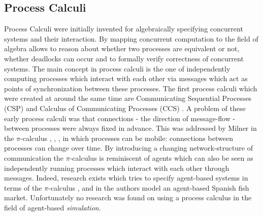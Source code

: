 \subsection{Process Calculi}
Process Calculi were initially invented for algebraically specifying concurrent systems and their interaction. By mapping concurrent computation to the field of algebra allows to reason about whether two processes are equivalent or not, whether deadlocks can occur and to formally verify correctness of concurrent systems. The main concept in process calculi is the one of independently computing processes which interact with each other via messages which act as points of synchronization between these processes. The first process calculi which were created at around the same time are Communicating Sequential Processes (CSP) \cite{hoare_communicating_1985} and Calculus of Communicating Processes (CCS) \cite{milner_calculus_1980}. A problem of these early process calculi was that connections - the direction of message-flow - between processes were always fixed in advance. This was addressed by Milner in the $\pi$-calculus \cite{milner_calculus_1992}, \cite{milner_calculus_1992-1}, \cite{milner_elements_1993}, \cite{milner_communicating_1999} in which processes can be mobile: connections between processes can change over time. 
By introducing a changing network-structure of communication the $\pi$-calculus is reminiscent of agents which can also be seen as independently running processes which interact with each other through messages. Indeed, research exists which tries to specify agent-based systems in terms of the $\pi$-calculus \cite{esterline_using_2001}, \cite{kawabe_nepi2programming_2000} and in \cite{padget_pi-calculus_1998} the authors model an agent-based Spanish fish market. Unfortunately no research was found on using a process calculus in the field of agent-based \textit{simulation}.
